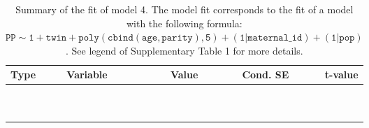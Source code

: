 \begin{table}[H]

\caption{\label{tab:tab4}Summary of the fit of model 4. The model fit corresponds to the fit of a model with the following formula: {\small$\mathtt{PP \sim 1 + twin + poly(cbind(age, parity), 5) + (1 | maternal\_id) + (1 | pop)}$}. See legend of Supplementary Table 1 for more details.}
\centering
\fontsize{8}{10}\selectfont
\begin{tabular}[t]{>{\raggedright\arraybackslash}p{3cm}>{\raggedright\arraybackslash}p{5cm}rrr}
\toprule
Type & Variable & Value & Cond. SE & t-value\\
\midrule
\cellcolor{gray!6}{fixed effects} & \cellcolor{gray!6}{$\beta_1$} & \cellcolor{gray!6}{1.57} & \cellcolor{gray!6}{0.179} & \cellcolor{gray!6}{8.74}\\
\cellcolor{gray!6}{} & \cellcolor{gray!6}{$\beta_{\mathtt{twin}}$} & \cellcolor{gray!6}{-0.412} & \cellcolor{gray!6}{0.0636} & \cellcolor{gray!6}{-6.47}\\
\cellcolor{gray!6}{} & \cellcolor{gray!6}{$\beta_{\mathtt{age}}$} & \cellcolor{gray!6}{-420} & \cellcolor{gray!6}{59.7} & \cellcolor{gray!6}{-7.04}\\
\cellcolor{gray!6}{} & \cellcolor{gray!6}{$\beta_{\mathtt{age}^2}$} & \cellcolor{gray!6}{-185} & \cellcolor{gray!6}{51.7} & \cellcolor{gray!6}{-3.57}\\
\cellcolor{gray!6}{} & \cellcolor{gray!6}{$\beta_{\mathtt{age}^3}$} & \cellcolor{gray!6}{-43.7} & \cellcolor{gray!6}{32.6} & \cellcolor{gray!6}{-1.34}\\
\cellcolor{gray!6}{} & \cellcolor{gray!6}{$\beta_{\mathtt{age}^4}$} & \cellcolor{gray!6}{-15.7} & \cellcolor{gray!6}{14.3} & \cellcolor{gray!6}{-1.09}\\
\cellcolor{gray!6}{} & \cellcolor{gray!6}{$\beta_{\mathtt{age}^5}$} & \cellcolor{gray!6}{2.47} & \cellcolor{gray!6}{9.7} & \cellcolor{gray!6}{0.255}\\
\cellcolor{gray!6}{} & \cellcolor{gray!6}{$\beta_{\mathtt{parity}}$} & \cellcolor{gray!6}{49.1} & \cellcolor{gray!6}{97.6} & \cellcolor{gray!6}{0.502}\\
\cellcolor{gray!6}{} & \cellcolor{gray!6}{$\beta_{\mathtt{age}\times\mathtt{parity}}$} & \cellcolor{gray!6}{12922} & \cellcolor{gray!6}{39528} & \cellcolor{gray!6}{0.327}\\
\cellcolor{gray!6}{} & \cellcolor{gray!6}{$\beta_{\mathtt{age}^2\times\mathtt{parity}}$} & \cellcolor{gray!6}{-33721} & \cellcolor{gray!6}{30550} & \cellcolor{gray!6}{-1.1}\\

\end{tabular}
\end{table}
